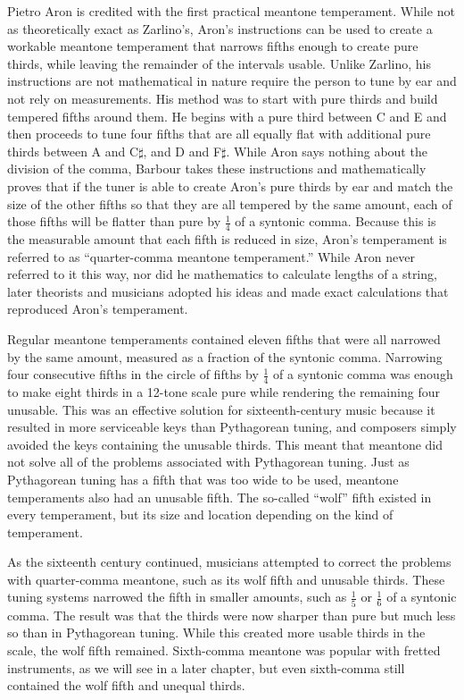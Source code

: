 Pietro Aron is credited with the first practical meantone temperament.  While not as theoretically
exact as Zarlino's, Aron's instructions can be used to create a workable meantone temperament that
narrows fifths enough to create pure thirds, while leaving the remainder of the intervals usable.
Unlike Zarlino, his instructions are not mathematical in nature require the person to tune by ear
and not rely on measurements.  His method was to start with pure thirds and build tempered fifths
around them.  He begins with a pure third between C and E and then proceeds to tune four fifths that
are all equally flat with additional pure thirds between A and C$\sharp$, and D and F$\sharp$.
While Aron says nothing about the division of the comma, Barbour takes these instructions and
mathematically proves that if the tuner is able to create Aron's pure thirds by ear and match the
size of the other fifths so that they are all tempered by the same amount, each of those fifths will
be flatter than pure by $ \frac{1}{4} $ of a syntonic comma.\autocite[27]{MB:1}  Because this is the
measurable amount that each fifth is reduced in size, Aron's temperament is referred to as
``quarter-comma meantone temperament.'' While Aron never referred to it this way, nor did he
mathematics to calculate lengths of a string, later theorists and musicians adopted his ideas and made
exact calculations that reproduced Aron's temperament.

Regular meantone temperaments contained eleven fifths that were all narrowed by the same
amount, measured as a fraction of the syntonic comma. Narrowing
four consecutive fifths in the circle of fifths by $ \frac{1}{4} $ of a syntonic comma was
enough to make eight thirds in a 12-tone scale pure while rendering the remaining four
unusable.\autocite[33]{RD:1}  This was an effective solution for
sixteenth-century music because it resulted in more serviceable keys than Pythagorean
tuning, and composers simply avoided the keys containing the unusable thirds.
This meant that meantone did not solve all of the problems associated with
Pythagorean tuning.  Just as Pythagorean tuning has a fifth that was too wide to be used,
meantone temperaments also had an unusable fifth.  The so-called ``wolf'' fifth existed in
every temperament, but its size and location depending on the kind of temperament.

As the sixteenth century continued, musicians attempted to correct the problems with
quarter-comma meantone, such as its wolf fifth and unusable thirds.
These tuning systems narrowed the fifth in smaller amounts, such as $
\frac{1}{5} $ or $ \frac{1}{6} $ of a syntonic comma. The result was that the thirds were
now sharper than pure but much less so than in Pythagorean tuning.  While this created
more usable thirds in the scale, the wolf fifth remained.  Sixth-comma meantone was
popular with fretted instruments, as we will see in a later chapter, but even sixth-comma
still contained the wolf fifth and unequal thirds.

